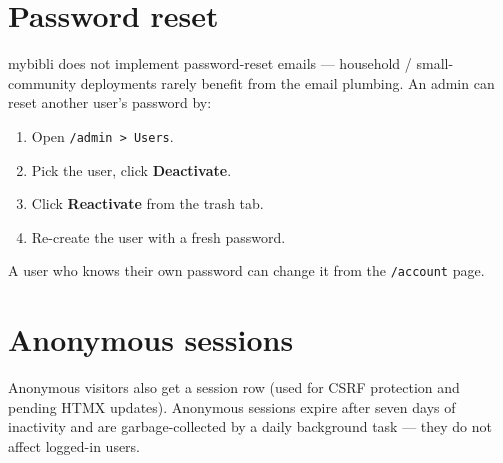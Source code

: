 \section{Password reset}

mybibli does not implement password-reset emails — household /
small-community deployments rarely benefit from the email
plumbing. An admin can reset another user's password by:

\begin{enumerate}
  \item Open \texttt{/admin > Users}.
  \item Pick the user, click \textbf{Deactivate}.
  \item Click \textbf{Reactivate} from the trash tab.
  \item Re-create the user with a fresh password.
\end{enumerate}

A user who knows their own password can change it from the
\texttt{/account} page.

\section{Anonymous sessions}

Anonymous visitors also get a session row (used for CSRF protection
and pending HTMX updates). Anonymous sessions expire after seven
days of inactivity and are garbage-collected by a daily background
task — they do not affect logged-in users.
